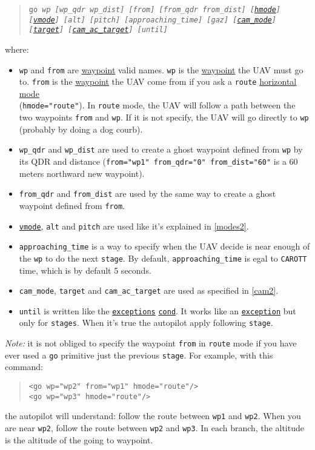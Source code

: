 \documentclass{article}
\renewcommand{\tt}[1]{\texttt{#1}}
\newcommand{\ex}[1]{\colorbox[gray]{0.92}{\tt{#1}}}
\newcommand{\until}{%
	\tt{until} is written like the \tt{\hyperlink{exceptions}{exceptions}}
		\tt{\hyperlink{cond}{cond}}. It works like an
		\tt{\hyperlink{exceptions}{exception}} but only for \tt{stages}.
		When it's true the autopilot apply following \tt{stage}.
}
\newcommand{\qt}[1]{\textcolor{gris75}{#1}}
\begin{document}
\begin{quote}
	\tt{go \emph{wp [wp\_qdr wp\_dist] [from] [from\_qdr from\_dist]
	[\hyperlink{horizontalmodes}{hmode}] [\hyperlink{verticalmodes}{vmode}]
	[alt] [pitch] [approaching\_time] [gaz] [\hyperlink{cam}{cam\_mode}]
	[\hyperlink{cam}{target}] [\hyperlink{cam}{cam\_ac\_target}] [until]}}
\end{quote}


where:
\begin{itemize}
	\item \tt{wp} and \tt{from} are \hyperlink{waypoints}{waypoint} valid names.
	\tt{wp} is the \hyperlink{waypoints}{waypoint} the UAV must go to.
	\tt{from} is the \hyperlink{waypoints}{waypoint} the UAV come from if
	you ask a \tt{route} \hyperlink{horizontalmodes}{horizontal mode}\\
	(\ex{\tt{hmode="\qt{route}"}}).
	In \tt{route} mode, the UAV will follow a path between the two waypoints
	\tt{from} and \tt{wp}. If it is not specify, the UAV will go directly
	to \tt{wp} (probably by doing a dog courb).
	
	\item \tt{wp\_qdr} and \tt{wp\_dist} are used to create a ghost waypoint
	defined from \tt{wp} by its QDR and distance (\ex{from="\qt{wp1}"
	from\_qdr="\qt{0}" from\_dist="\qt{60}"} is a 60 meters northward new
	waypoint).
	
	\item \tt{from\_qdr} and \tt{from\_dist} are used by the same way to create
	a ghost waypoint defined from \tt{from}.
	
	\item \hyperlink{verticalmodes}{\tt{vmode}}, \tt{alt} and \tt{pitch} are
	used like it's explained in \autoref{modes2}.
	
	\item \tt{approaching\_time} is a way to specify when the UAV decide
	is near enough of the \tt{wp} to do the next \tt{stage}. By default,
	\tt{approaching\_time} is egal to \tt{CAROTT} time, which is by
	default 5 seconds.
	
	\item \tt{cam\_mode}, \tt{target} and \tt{cam\_ac\_target} are used as
	specified in \autoref{cam2}.
	
	\item \until	
\end{itemize}

\emph{Note:} it is not obliged to specify the waypoint \tt{from} in \tt{route}
mode if you have ever used a \tt{go} primitive just the previous \tt{stage}.
For example, with this command:
\begin{quote}
	\ex{<go wp="\qt{wp2}" from="\qt{wp1}" hmode="\qt{route}"/>} \\
	\ex{<go wp="\qt{wp3}" hmode="\qt{route}"/>}
\end{quote}
the autopilot will understand: follow the route between \tt{wp1} and \tt{wp2}.
When you are near \tt{wp2}, follow the route between \tt{wp2} and \tt{wp3}.
In each branch, the altitude is the altitude of the going to waypoint.
\\
\end{document}
